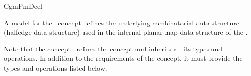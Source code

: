 \ccRefPageBegin

\begin{ccRefConcept}{CgmPmDcel}

A model for the \ccRefName\ concept defines the underlying combinatorial data
structure (halfedge data structure) used in the internal planar map data
structure of the .

Note that the concept \ccRefName\ refines the concept 
and inherits all its types and operations. In addition to the requirements of
the  concept, it must provide the types and operations
listed below.

\ccTypes


  
\ccHasModels

\end{ccRefConcept}
\ccRefPageEnd
